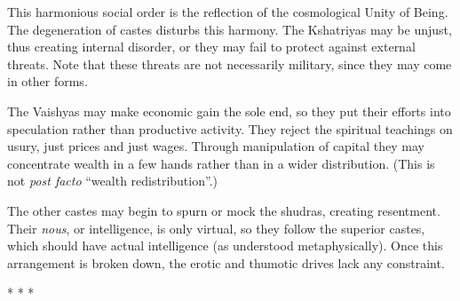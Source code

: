 This harmonious social order is the reflection of the cosmological Unity of Being. The degeneration of castes disturbs this harmony. The Kshatriyas may be unjust, thus creating internal disorder, or they may fail to protect against external threats. Note that these threats are not necessarily military, since they may come in other forms.

The Vaishyas may make economic gain the sole end, so they put their efforts into speculation rather than productive activity. They reject the spiritual teachings on usury, just prices and just wages. Through manipulation of capital they may concentrate wealth in a few hands rather than in a wider distribution. (This is not \emph{post facto} ``wealth redistribution''.)

The other castes may begin to spurn or mock the shudras, creating resentment. Their \emph{nous}, or intelligence, is only virtual, so they follow the superior castes, which should have actual intelligence (as understood metaphysically). Once this arrangement is broken down, the erotic and thumotic drives lack any constraint.



\begin{center}* * *\end{center}

